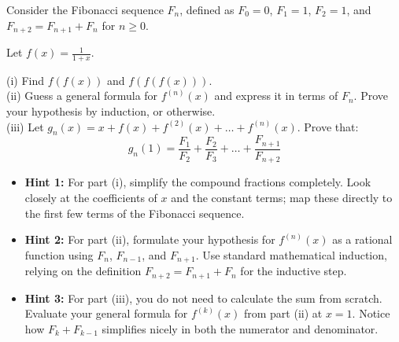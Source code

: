 \begin{problem}
Consider the Fibonacci sequence $F_n$, defined as $F_0 = 0$, $F_1 = 1$, $F_2 = 1$, and $F_{n+2} = F_{n+1} + F_n$ for $n \geqslant 0$.

Let $f(x) = \frac{1}{1+x}$.

(i) Find $f(f(x))$ and $f(f(f(x)))$.\\
(ii) Guess a general formula for $f^{(n)}(x)$ and express it in terms of $F_n$. Prove your hypothesis by induction, or otherwise.\\
(iii) Let $g_n(x) = x + f(x) + f^{(2)}(x) + \dots + f^{(n)}(x)$. Prove that:
\[
g_n(1) = \frac{F_1}{F_2} + \frac{F_2}{F_3} + \dots + \frac{F_{n+1}}{F_{n+2}}
\]
\end{problem}

\begin{hint}
\begin{itemize}[leftmargin=*]
    \item \textbf{Hint 1:} For part (i), simplify the compound fractions completely. Look closely at the coefficients of $x$ and the constant terms; map these directly to the first few terms of the Fibonacci sequence.
    \item \textbf{Hint 2:} For part (ii), formulate your hypothesis for $f^{(n)}(x)$ as a rational function using $F_n$, $F_{n-1}$, and $F_{n+1}$. Use standard mathematical induction, relying on the definition $F_{n+2} = F_{n+1} + F_n$ for the inductive step.
    \item \textbf{Hint 3:} For part (iii), you do not need to calculate the sum from scratch. Evaluate your general formula for $f^{(k)}(x)$ from part (ii) at $x=1$. Notice how $F_k + F_{k-1}$ simplifies nicely in both the numerator and denominator.
\end{itemize}
\end{hint}

